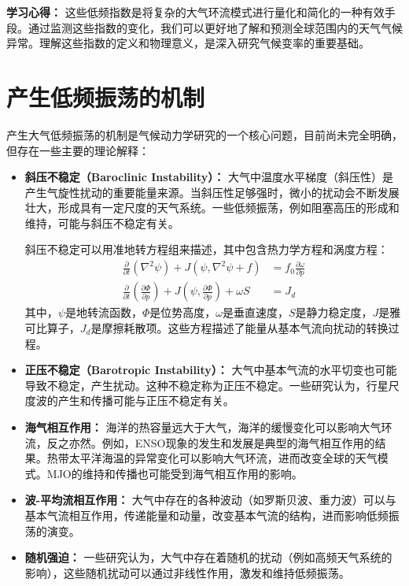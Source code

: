 \documentclass[10pt,hyperref,a4paper,UTF8]{ctexart}
\begin{document}
\textbf{学习心得：} 这些低频指数是将复杂的大气环流模式进行量化和简化的一种有效手段。通过监测这些指数的变化，我们可以更好地了解和预测全球范围内的天气气候异常。理解这些指数的定义和物理意义，是深入研究气候变率的重要基础。

\section{产生低频振荡的机制}

产生大气低频振荡的机制是气候动力学研究的一个核心问题，目前尚未完全明确，但存在一些主要的理论解释：

\begin{itemize}
    \item \textbf{斜压不稳定（Baroclinic Instability）：} 大气中温度水平梯度（斜压性）是产生气旋性扰动的重要能量来源。当斜压性足够强时，微小的扰动会不断发展壮大，形成具有一定尺度的天气系统。一些低频振荡，例如阻塞高压的形成和维持，可能与斜压不稳定有关。

        斜压不稳定可以用准地转方程组来描述，其中包含热力学方程和涡度方程：
        \begin{align}
        \frac{\partial}{\partial t} (\nabla^2 \psi) + J(\psi, \nabla^2 \psi + f) &= f_0 \frac{\partial \omega}{\partial p} \\
        \frac{\partial}{\partial t} \left(\frac{\partial \Phi}{\partial p}\right) + J\left(\psi, \frac{\partial \Phi}{\partial p}\right) + \omega S &= J_d
        \end{align}
        其中，$\psi$是地转流函数，$\Phi$是位势高度，$\omega$是垂直速度，$S$是静力稳定度，$J$是雅可比算子，$J_d$是摩擦耗散项。这些方程描述了能量从基本气流向扰动的转换过程。

    \item \textbf{正压不稳定（Barotropic Instability）：} 大气中基本气流的水平切变也可能导致不稳定，产生扰动。这种不稳定称为正压不稳定。一些研究认为，行星尺度波的产生和传播可能与正压不稳定有关。

    \item \textbf{海气相互作用：} 海洋的热容量远大于大气，海洋的缓慢变化可以影响大气环流，反之亦然。例如，ENSO现象的发生和发展是典型的海气相互作用的结果。热带太平洋海温的异常变化可以影响大气环流，进而改变全球的天气模式。MJO的维持和传播也可能受到海气相互作用的影响。

    \item \textbf{波-平均流相互作用：} 大气中存在的各种波动（如罗斯贝波、重力波）可以与基本气流相互作用，传递能量和动量，改变基本气流的结构，进而影响低频振荡的演变。

    \item \textbf{随机强迫：} 一些研究认为，大气中存在着随机的扰动（例如高频天气系统的影响），这些随机扰动可以通过非线性作用，激发和维持低频振荡。
\end{itemize}
\end{document}
